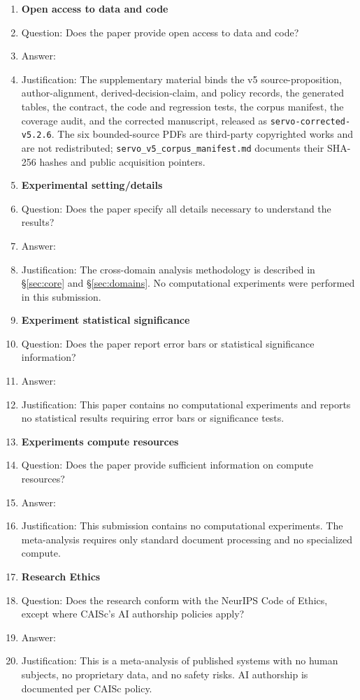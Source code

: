 \documentclass{article}
\begin{document}
\begin{enumerate}
\item {\bf Open access to data and code}
    \item[] Question: Does the paper provide open access to data and code?
    \item[] Answer: \answerYes{}
    \item[] Justification: The supplementary material binds the v5 source-proposition, author-alignment, derived-decision-claim, and policy records, the generated tables, the contract, the code and regression tests, the corpus manifest, the coverage audit, and the corrected manuscript, released as \texttt{servo-corrected-v5.2.6}. The six bounded-source PDFs are third-party copyrighted works and are not redistributed; \texttt{servo\_v5\_corpus\_manifest.md} documents their SHA-256 hashes and public acquisition pointers.

\item {\bf Experimental setting/details}
    \item[] Question: Does the paper specify all details necessary to understand the results?
    \item[] Answer: \answerYes{}
    \item[] Justification: The cross-domain analysis methodology is described in \S\ref{sec:core} and \S\ref{sec:domains}. No computational experiments were performed in this submission.

\item {\bf Experiment statistical significance}
    \item[] Question: Does the paper report error bars or statistical significance information?
    \item[] Answer: \answerNA{}
    \item[] Justification: This paper contains no computational experiments and reports no statistical results requiring error bars or significance tests.

\item {\bf Experiments compute resources}
    \item[] Question: Does the paper provide sufficient information on compute resources?
    \item[] Answer: \answerNA{}
    \item[] Justification: This submission contains no computational experiments. The meta-analysis requires only standard document processing and no specialized compute.

\item {\bf Research Ethics}
    \item[] Question: Does the research conform with the NeurIPS Code of Ethics, except where CAISc's AI authorship policies apply?
    \item[] Answer: \answerYes{}
    \item[] Justification: This is a meta-analysis of published systems with no human subjects, no proprietary data, and no safety risks. AI authorship is documented per CAISc policy.


\end{enumerate}
\end{document}

